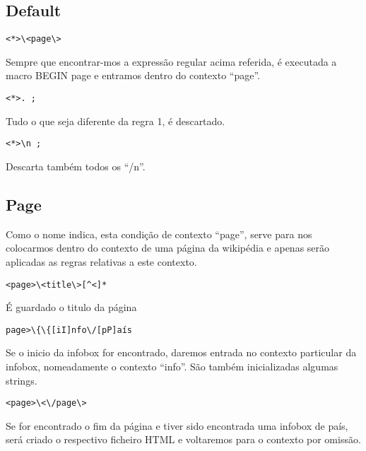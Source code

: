 \documentclass[12pt,a4paper]{report}
\begin{document}
\subsection{Default}
\begin{verbatim}
<*>\<page\> 
\end{verbatim}
Sempre que encontrar-mos a expressão regular acima referida, é executada a macro BEGIN page e entramos dentro do contexto ``page''.
\begin{verbatim}
<*>. ;
\end{verbatim}
Tudo o que seja diferente da regra 1, é descartado.
\begin{verbatim}
<*>\n ;
\end{verbatim}
Descarta também todos os ``/n''.
\subsection{Page}

Como o nome indica, esta condição de contexto ``page'', serve para nos colocarmos dentro do contexto de uma página da wikipédia e apenas serão aplicadas as regras relativas a este contexto.
\begin{verbatim}
<page>\<title\>[^<]*
\end{verbatim}
É guardado o titulo da página
\begin{verbatim}
page>\{\{[iI]nfo\/[pP]aís
\end{verbatim}
Se o inicio da infobox for encontrado, daremos entrada no contexto particular da infobox, nomeadamente o contexto ``info''. São também inicializadas algumas strings.
\begin{verbatim}
<page>\<\/page\> 
\end{verbatim}
Se for encontrado o fim da página e tiver sido encontrada uma infobox de país, será criado o respectivo ficheiro HTML e voltaremos para o contexto por omissão.
\end{document}
